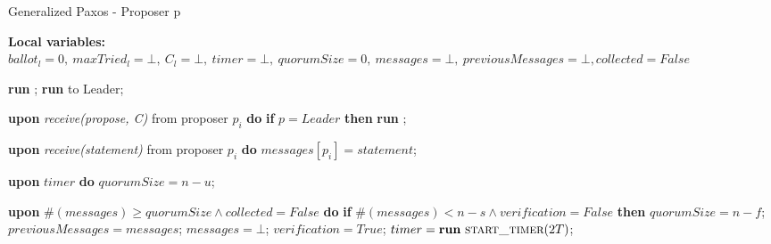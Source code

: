 \documentclass[10pt,pdftex,a4paper]{article}%
\begin{document}
\begin{algorithm}
\caption{Generalized Paxos - Proposer p}
\textbf{Local variables:} $ballot_l = 0,\ maxTried_l = \bot,\ C_l = \bot,\ timer = \bot,\ quorumSize = 0,\ messages = \bot,\ previousMessages = \bot, collected = False$
\begin{algorithmic}[1]

        \State \textbf{run} ;
    \Else
        \State \textbf{run}  to Leader;
    \EndIf
    \EndFunction
        
    \State
    \State \textbf{upon} \textit{receive(propose, C)} from proposer $p_i$ \textbf{do} 
        \State \hspace{\algorithmicindent} \textbf{if} $p = Leader$ \textbf{then}
            \State \hspace{\algorithmicindent}\hspace{\algorithmicindent} \textbf{run} ;
    
    \State
    \State \textbf{upon} \textit{receive(statement)} from proposer $p_i$ \textbf{do}
    \State \hspace{\algorithmicindent} $messages[p_i] = statement$;
    
    \State
    \State \textbf{upon} $timer$ \textbf{do} 
    \State \hspace{\algorithmicindent} $quorumSize = n-u$;

    \State     
    \State \textbf{upon} $\#(messages) \geq quorumSize \land collected = False$ \textbf{do} 
        \State \hspace{\algorithmicindent} \textbf{if }{$\#(messages) < n-s \land verification = False$} \textbf{then}
            \State \hspace{\algorithmicindent}\hspace{\algorithmicindent} $quorumSize = n-f$;
            \State \hspace{\algorithmicindent}\hspace{\algorithmicindent}
            $previousMessages = messages$;
            \State \hspace{\algorithmicindent}\hspace{\algorithmicindent}
            $messages = \bot$;
            \State \hspace{\algorithmicindent}\hspace{\algorithmicindent} $verification = True$;
            \State \hspace{\algorithmicindent}\hspace{\algorithmicindent} $timer = \textbf{run}\ \Call{start\_timer}{2T}$;


\end{algorithmic}
\end{algorithm}
\end{document}
